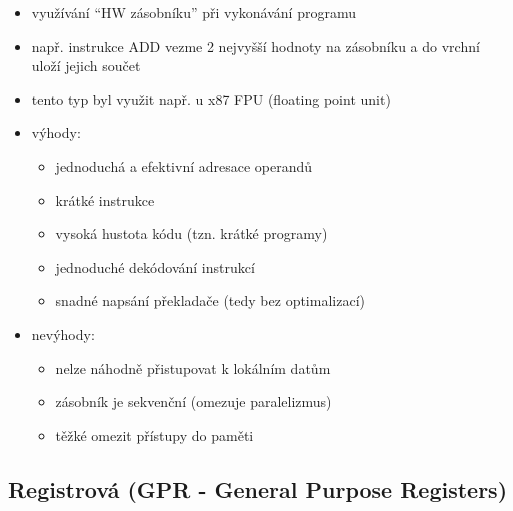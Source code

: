 \documentclass{szzclass}
\providecommand{\tightlist}{%
  \setlength{\itemsep}{0pt}\setlength{\parskip}{0pt}}
\begin{document}
\begin{itemize}
\tightlist
\item
  využívání ``HW zásobníku'' při vykonávání programu
\item
  např. instrukce ADD vezme 2 nejvyšší hodnoty na zásobníku a do vrchní
  uloží jejich součet
\item
  tento typ byl využit např. u x87 FPU (floating point unit)
\item
  výhody:

  \begin{itemize}
  \tightlist
  \item
    jednoduchá a efektivní adresace operandů
  \item
    krátké instrukce
  \item
    vysoká hustota kódu (tzn. krátké programy)
  \item
    jednoduché dekódování instrukcí
  \item
    snadné napsání překladače (tedy bez optimalizací)
  \end{itemize}
\item
  nevýhody:

  \begin{itemize}
  \tightlist
  \item
    nelze náhodně přistupovat k lokálním datům
  \item
    zásobník je sekvenční (omezuje paralelizmus)
  \item
    těžké omezit přístupy do paměti
  \end{itemize}
\end{itemize}

\pagebreak

\hypertarget{registrovuxe1-gpr---general-purpose-registers}{%
\subsection{Registrová (GPR - General Purpose
Registers)}\label{registrovuxe1-gpr---general-purpose-registers}}
\end{document}
